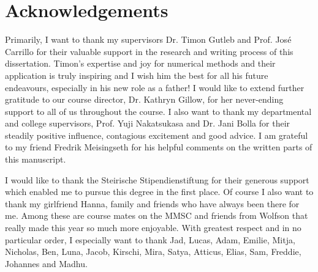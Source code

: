 \chapter*{Acknowledgements}

Primarily, I want to thank my supervisors Dr. Timon Gutleb and Prof. José Carrillo for their valuable support in the research and writing process of this dissertation.
Timon's expertise and joy for numerical methods and their application is truly inspiring and I wish him the best for all his future endeavours, especially in his new role as a father!
I would like to extend further gratitude to our course director, Dr. Kathryn Gillow, for her never-ending support to all of us throughout the course.
I also want to thank my departmental and college supervisors, Prof. Yuji Nakatsukasa and Dr. Jani Bolla for their steadily positive influence, contagious excitement and good advice.
I am grateful to my friend Fredrik Meisingseth for his helpful comments on the written parts of this manuscript.

I would like to thank the Steirische Stipendienstiftung for their generous support which enabled me to pursue this degree in the first place.
Of course I also want to thank my girlfriend Hanna, family and friends who have always been there for me.
Among these are course mates on the MMSC and friends from Wolfson that really made this year so much more enjoyable.
With greatest respect and in no particular order, I especially want to thank Jad, Lucas, Adam, Emilie, Mitja, Nicholas, Ben, Luna, Jacob, Kirschi, Mira, Satya, Atticus, Elias, Sam, Freddie, Johannes and Madhu.



